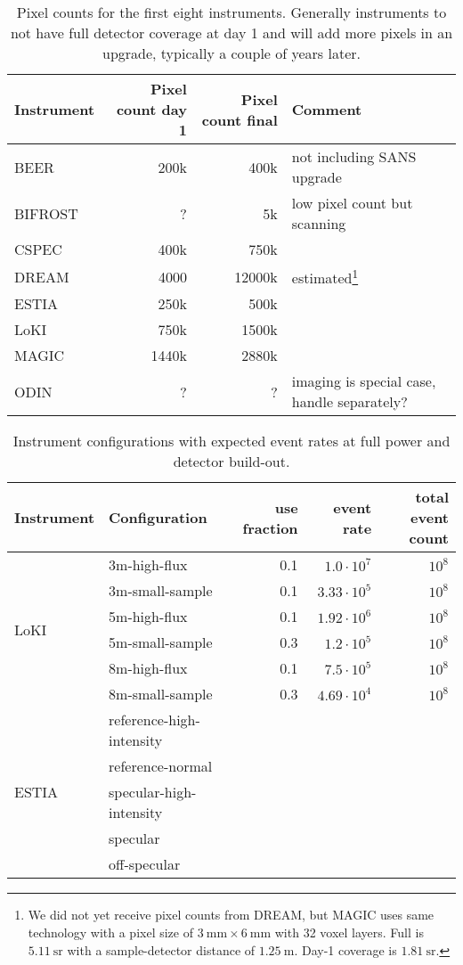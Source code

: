 \documentclass[a4paper,english,numbers=noenddot,bibliography=totoc,chapterprefix=on,DIV=12]{scrartcl}
\newcommand{\beer}{BEER\xspace}
\newcommand{\bifrost}{BIFROST\xspace}
\newcommand{\cspec}{CSPEC\xspace}
\newcommand{\dream}{DREAM\xspace}
\newcommand{\estia}{ESTIA\xspace}
\newcommand{\loki}{LoKI\xspace}
\newcommand{\magic}{MAGIC\xspace}
\newcommand{\odin}{ODIN\xspace}
\begin{document}
\begin{table}
  \centering
  \begin{tabular}{lrrl}
    Instrument & Pixel count day 1 & Pixel count final & Comment\\
    \hline
    \beer & 200k & 400k & not including SANS upgrade\\
    \bifrost & ? & 5k & low pixel count but scanning\\
    \cspec & 400k & 750k \\
    \dream & 4000 & 12000k & estimated\footnote{We did not yet receive pixel counts from DREAM, but MAGIC uses same technology with a pixel size of $3~\mathrm{mm} \times 6~\mathrm{mm}$ with 32 voxel layers. Full is $5.11~\mathrm{sr}$ with a sample-detector distance of $1.25~\mathrm{m}$. Day-1 coverage is $1.81~\mathrm{sr}$.}\\
    \estia & 250k & 500k \\
    \loki & 750k & 1500k \\
    \magic & 1440k & 2880k \\
    \odin & ? & ? & imaging is special case, handle separately?\\
  \end{tabular}
  \caption{\label{tab:pixel-counts}Pixel counts for the first eight instruments. Generally instruments to not have full detector coverage at day 1 and will add more pixels in an upgrade, typically a couple of years later.}
\end{table}

\begin{table}
  \centering
  \begin{tabular}{llrrr}
    Instrument & Configuration & use fraction & event rate & total event count \\
    \hline
    \hline
    \multirow{6}{*}{\loki}
    & 3m-high-flux    & 0.1 & $1.0\cdot10^7$ & $10^8$ \\
    & 3m-small-sample & 0.1 & $3.33\cdot10^5$ & $10^8$ \\
    & 5m-high-flux    & 0.1 & $1.92\cdot10^6$ & $10^8$ \\
    & 5m-small-sample & 0.3 & $1.2\cdot10^5$ & $10^8$ \\
    & 8m-high-flux    & 0.1 & $7.5\cdot10^5$ & $10^8$ \\
    & 8m-small-sample & 0.3 & $4.69\cdot10^4$ & $10^8$ \\
    \hline
    \multirow{5}{*}{\estia} & reference-high-intensity\\ & reference-normal\\ & specular-high-intensity\\ & specular\\ & off-specular\\
  \end{tabular}
  \caption{\label{tab:configurations}Instrument configurations with expected event rates at full power and detector build-out.}
\end{table}
\end{document}
